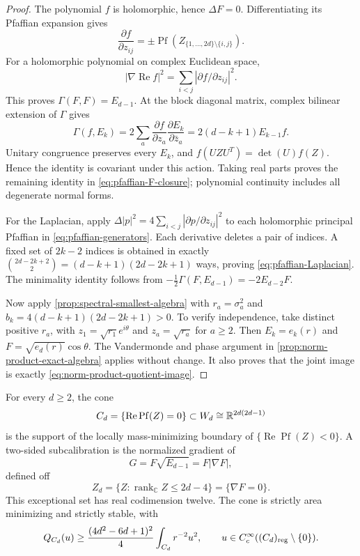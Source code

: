 \begin{proof}
The polynomial \(f\) is holomorphic, hence \(\Delta F=0\).
Differentiating its Pfaffian expansion gives
\[
 \frac{\partial f}{\partial z_{ij}}
   =\pm\operatorname{Pf}(Z_{\{1,\ldots,2d\}\setminus\{i,j\}}).
\]
For a holomorphic polynomial on complex Euclidean space,
\[
 |\nabla\operatorname{Re}f|^2=\sum_{i<j}|\partial f/\partial z_{ij}|^2.
\]
This proves \(\Gamma(F,F)=E_{d-1}\).
At the block diagonal matrix, complex bilinear extension of
\(\Gamma\) gives
\[
 \Gamma(f,E_k)
 =2\sum_a\frac{\partial f}{\partial z_a}
                \frac{\partial E_k}{\partial\bar z_a}
 =2(d-k+1)E_{k-1}f.
\]
Unitary congruence preserves every \(E_k\), and \(f(UZU^T)=\det(U)f(Z)\).
Hence the identity is covariant under this action.
Taking real parts proves the remaining identity in
\eqref{eq:pfaffian-F-closure}; polynomial continuity includes all
degenerate normal forms.

For the Laplacian, apply
\(\Delta|p|^2=4\sum_{i<j}|\partial p/\partial z_{ij}|^2\)
to each holomorphic principal Pfaffian in \eqref{eq:pfaffian-generators}.
Each derivative deletes a pair of indices.  A fixed set of \(2k-2\)
indices is obtained in exactly
\(\binom{2d-2k+2}{2}=(d-k+1)(2d-2k+1)\) ways, proving
\eqref{eq:pfaffian-Laplacian}.
The minimality identity follows from
\(-\tfrac12\Gamma(F,E_{d-1})=-2E_{d-2}F\).

Now apply \cref{prop:spectral-smallest-algebra} with
\(r_a=\sigma_a^2\) and \(b_k=4(d-k+1)(2d-2k+1)>0\).
To verify independence, take distinct positive \(r_a\), with
\(z_1=\sqrt{r_1}e^{i\theta}\) and \(z_a=\sqrt{r_a}\) for \(a\ge2\).
Then \(E_k=e_k(r)\) and \(F=\sqrt{e_d(r)}\cos\theta\).
The Vandermonde and phase argument in
\cref{prop:norm-product-exact-algebra} applies without change.
It also proves that the joint image is exactly
\eqref{eq:norm-product-quotient-image}.
\end{proof}

\begin{theorem}
\label{thm:pfaffian-minimizing}
For every \(d\ge2\), the cone
\[
 C_d=\{\operatorname{Re}\operatorname{Pf}(Z)=0\}
 \subset W_d\cong\mathbb R^{2d(2d-1)}
\]
is the support of the locally mass-minimizing boundary of
\(\{\operatorname{Re}\operatorname{Pf}(Z)<0\}\).
A two-sided subcalibration is the normalized gradient of
\begin{equation}\label{eq:pfaffian-potential}
 G=F\sqrt{E_{d-1}}=F|\nabla F|,
\end{equation}
defined off
\begin{equation}\label{eq:pfaffian-critical-set}
 Z_d=\{Z:\operatorname{rank}_{\mathbb C}Z\le2d-4\}
     =\{\nabla F=0\}.
\end{equation}
This exceptional set has real codimension twelve.
The cone is strictly area minimizing and strictly stable, with
\begin{equation}\label{eq:pfaffian-Hardy-gap}
 Q_{C_d}(u)\ge\frac{(4d^2-6d+1)^2}{4}\int_{C_d}r^{-2}u^2,
 \qquad u\in C_c^\infty((C_d)_{\mathrm{reg}}\setminus\{0\}).
\end{equation}
\end{theorem}

